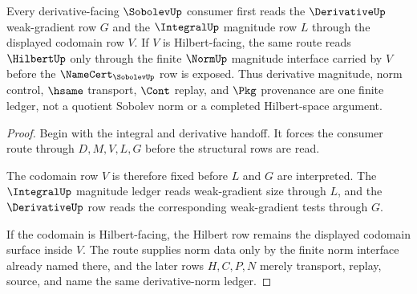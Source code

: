 \begin{theorem}
\label{thm:sobolev-derivative-norm-ledger}
Every derivative-facing $\SobolevUp$ consumer first reads the $\DerivativeUp$ weak-gradient row $G$ and the $\IntegralUp$ magnitude row $L$ through the displayed codomain row $V$. If $V$ is Hilbert-facing, the same route reads $\HilbertUp$ only through the finite $\NormUp$ magnitude interface carried by $V$ before the $\NameCert_{\SobolevUp}$ row is exposed. Thus derivative magnitude, norm control, $\hsame$ transport, $\Cont$ replay, and $\Pkg$ provenance are one finite ledger, not a quotient Sobolev norm or a completed Hilbert-space argument.
\end{theorem}
\begin{proof}
Begin with the integral and derivative handoff. It forces the consumer route through $D,M,V,L,G$ before the structural rows are read.

The codomain row $V$ is therefore fixed before $L$ and $G$ are interpreted. The $\IntegralUp$ magnitude ledger reads weak-gradient size through $L$, and the $\DerivativeUp$ row reads the corresponding weak-gradient tests through $G$.

If the codomain is Hilbert-facing, the Hilbert row remains the displayed codomain surface inside $V$. The route supplies norm data only by the finite norm interface already named there, and the later rows $H,C,P,N$ merely transport, replay, source, and name the same derivative-norm ledger.
\end{proof}

